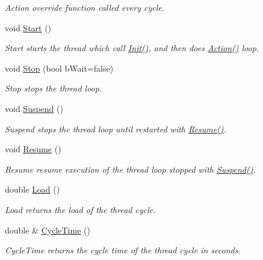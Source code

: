 \begin{DoxyCompactItemize}
\begin{DoxyCompactList}\small\item\em Action override function called every cycle. \end{DoxyCompactList}\item 
void \hyperlink{classRCS_1_1Thread_a86b50ec69dd0baeda270b115d72c1c15}{Start} ()
\begin{DoxyCompactList}\small\item\em Start starts the thread which call \hyperlink{classRCS_1_1Thread_a53ee19c04d064c9a23f0909cf9a4b2cc}{Init()}, and then does \hyperlink{classRCS_1_1Thread_a78aec7128f4fbf5d6859ceb09f9f9ae1}{Action()} loop. \end{DoxyCompactList}\item 
void \hyperlink{classRCS_1_1Thread_ae0c4a68567ab695f4b7daf755ab874d6}{Stop} (bool b\-Wait=false)
\begin{DoxyCompactList}\small\item\em Stop stops the thread loop. \end{DoxyCompactList}\item 
void \hyperlink{classRCS_1_1Thread_a6a5f86951a6b1fa10bc90844366bd23e}{Suspend} ()
\begin{DoxyCompactList}\small\item\em Suspend stops the thread loop until restarted with \hyperlink{classRCS_1_1Thread_adf2b3b0fc8b643b1fd2b6f28f30c7a2e}{Resume()}. \end{DoxyCompactList}\item 
void \hyperlink{classRCS_1_1Thread_adf2b3b0fc8b643b1fd2b6f28f30c7a2e}{Resume} ()
\begin{DoxyCompactList}\small\item\em Resume resume execution of the thread loop stopped with \hyperlink{classRCS_1_1Thread_a6a5f86951a6b1fa10bc90844366bd23e}{Suspend()}. \end{DoxyCompactList}\item 
double \hyperlink{classRCS_1_1Thread_a0de02ea91ce412d0770452dcd2256e35}{Load} ()
\begin{DoxyCompactList}\small\item\em Load returns the load of the thread cycle. \end{DoxyCompactList}\item 
double \& \hyperlink{classRCS_1_1Thread_a1738e943d3ca8a9861941610db819161}{Cycle\-Time} ()
\begin{DoxyCompactList}\small\item\em Cycle\-Time returns the cycle time of the thread cycle in seconds. \end{DoxyCompactList}\item 

\end{DoxyCompactItemize}

